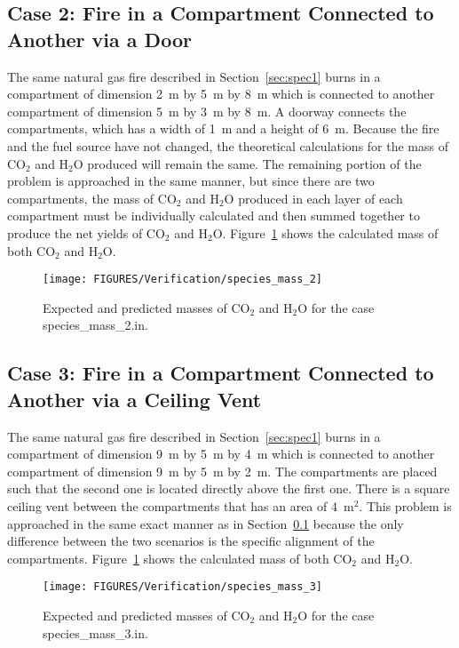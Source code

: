 \subsection{Case 2: Fire in a Compartment Connected to Another via a Door}
\label{sec:spec2}

The same natural gas fire described in Section~\ref{sec:spec1} burns in a compartment of dimension 2~m by 5~m by 8~m which is connected to another compartment of dimension 5~m by 3~m by 8~m. A doorway connects the compartments, which has a width of 1~m and a height of 6~m. Because the fire and the fuel source have not changed, the theoretical calculations for the mass of CO$_2$ and H$_2$O produced will remain the same. The remaining portion of the problem is approached in the same manner, but since there are two compartments, the mass of CO$_2$ and H$_2$O produced in each layer of each compartment must be individually calculated and then summed together to produce the net yields of CO$_2$ and H$_2$O. Figure~\ref{specmass2} shows the calculated mass of both CO$_2$ and H$_2$O.
\begin{figure}[!ht]
\centering
\texttt{[image: FIGURES/Verification/species\_mass\_2]}
\caption[Results of the test case {\ct species\_mass\_1.in}]{Expected and predicted masses of CO$_2$ and H$_2$O for the case {\ct species\_mass\_2.in}.}
\label{specmass2}
\end{figure}

\subsection{Case 3: Fire in a Compartment Connected to Another via a Ceiling Vent}

The same natural gas fire described in Section~\ref{sec:spec1} burns in a compartment of dimension 9~m by 5~m by 4~m which is connected to another compartment of dimension 9~m by 5~m by 2~m. The compartments are placed such that the second one is located directly above the first one. There is a square ceiling vent between the compartments that has an area of 4~m$^2$. This problem is approached in the same exact manner as in Section~\ref{sec:spec2} because the only difference between the two scenarios is the specific alignment of the compartments.
Figure~\ref{specmass2} shows the calculated mass of both CO$_2$ and H$_2$O.
\begin{figure}[!ht]
\centering
\texttt{[image: FIGURES/Verification/species\_mass\_3]}
\caption[Results of the test case {\ct species\_mass\_3.in}]{Expected and predicted masses of CO$_2$ and H$_2$O for the case {\ct species\_mass\_3.in}.}
\label{specmass3}
\end{figure}

